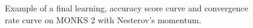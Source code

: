 \begin{appendices}
\begin{figure}[H]
\begin{subfigure}{0.40\textwidth}
                    \label{fig:monks_2_ACC_SGD}
                \end{subfigure}
                \begin{subfigure}{0.40\textwidth}
                    \caption{}
                    \label{fig:monks_2_NORM_SGD}
                \end{subfigure}
                \caption{Example of a final learning, accuracy score curve and
                convergence rate curve on MONKS 2 with Nesterov's momentum.}
                \label{fig:monks_1_SGD}
            \end{figure}


\end{appendices}
